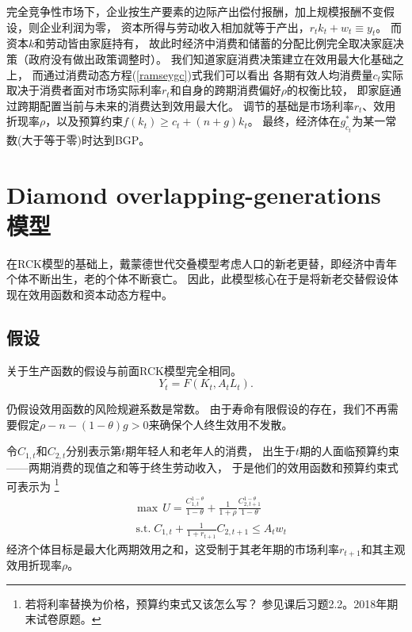 \documentclass[cn,normal,11pt,black]{elegantnote}
\begin{document}
\begin{remark}
    完全竞争性市场下，企业按生产要素的边际产出偿付报酬，加上规模报酬不变假设，则企业利润为零，
    资本所得与劳动收入相加就等于产出，$r_t k_t + w_t \equiv y_t$。
    而资本$k$和劳动皆由家庭持有，
    故此时经济中消费和储蓄的分配比例完全取决家庭决策（政府没有做出政策调整时）。
    我们知道家庭消费决策建立在效用最大化基础之上，
    而通过消费动态方程(\ref{ramseygc})式我们可以看出
    各期有效人均消费量$c_t$实际取决于消费者面对市场实际利率$r_t$和自身的跨期消费偏好$\rho$的权衡比较，
    即家庭通过跨期配置当前与未来的消费达到效用最大化。
    调节的基础是市场利率$r_t$、效用折现率$\rho$，以及预算约束$f(k_t) \geq c_t + (n+g)k_t$。
    最终，经济体在$g_{c_t}^*$为某一常数(大于等于零)时达到BGP。
\end{remark}

      
\section{Diamond overlapping-generations 模型}
    
在RCK模型的基础上，戴蒙德世代交叠模型考虑人口的新老更替，即经济中青年个体不断出生，老的个体不断衰亡。
因此，此模型核心在于是将新老交替假设体现在效用函数和资本动态方程中。

\subsection{假设}

\begin{definition}[生产函数]
    关于生产函数的假设与前面RCK模型完全相同。
    \begin{equation}
        Y_t = F(K_t, A_t L_t).
    \end{equation}
\end{definition}

\begin{definition}[个人效用函数]
    仍假设效用函数的风险规避系数是常数。
    由于寿命有限假设的存在，我们不再需要假定$\rho - n - (1-\theta)g > 0$来确保个人终生效用不发散。
    
    令$C_{1,t}$和$C_{2,t}$分别表示第$t$期年轻人和老年人的消费，
    出生于$t$期的人面临预算约束——两期消费的现值之和等于终生劳动收入，
    于是他们的效用函数和预算约束式可表示为
    \footnote{若将利率替换为价格，预算约束式又该怎么写？ 参见课后习题2.2。2018年期末试卷原题。}
    \begin{align}
        & \max \, U = \frac{C_{1,t}^{1-\theta}}{1-\theta} + \frac{1}{1+\rho} \frac{C_{2, t+1}^{1-\theta}}{1-\theta}  \\ 
        & \, \mathrm{s.t.} \;  C_{1,t} + \frac{1}{1+r_{t+1}} C_{2,t+1} \le A_t w_t
    \end{align}   
    经济个体目标是最大化两期效用之和，这受制于其老年期的市场利率$r_{t+1}$和其主观效用折现率$\rho$。
\end{definition}
\end{document}
